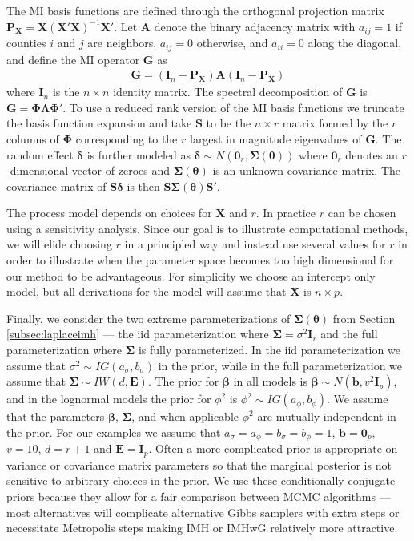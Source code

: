 \documentclass[12pt]{article}
\begin{document}
The MI basis functions are defined through the orthogonal projection matrix $\bm{P}_{\bm{X}} = \bm{X}(\bm{X}'\bm{X})^{-1}\bm{X}'$. Let $\bm{A}$ denote the binary adjacency matrix with $a_{ij} = 1$ if counties $i$ and $j$ are neighbors, $a_{ij}=0$ otherwise, and $a_{ii}=0$ along the diagonal, and define the MI operator $\bm{G}$ as
\begin{align*}
\bm{G} = (\bm{I}_n - \bm{P}_{\bm{X}})\bm{A}(\bm{I}_n - \bm{P}_{\bm{X}})
\end{align*}
where $\bm{I}_n$ is the $n\times n$ identity matrix. The spectral decomposition of $\bm{G}$ is $\bm{G} = \bm{\Phi}\bm{\Lambda}\bm{\Phi}'.$ To use a reduced rank version of the MI basis functions we truncate the basis function expansion and take $\bm{S}$ to be the $n\times r$ matrix formed by the $r$ columns of $\bm{\Phi}$ corresponding to the $r$ largest in magnitude eigenvalues of $\bm{G}$. The random effect $\bm{\delta}$ is further modeled as $\bm{\delta} \sim N(\bm{0}_r,\bm{\Sigma}(\bm{\theta}))$ where $\bm{0}_r$ denotes an $r$-dimensional vector of zeroes and $\bm{\Sigma}(\bm{\theta})$ is an unknown covariance matrix. The covariance matrix of $\bm{S}\bm{\delta}$ is then $\bm{S}\bm{\Sigma}(\bm{\theta})\bm{S}'$.

The process model depends on choices for $\bm{X}$ and $r$. In practice $r$ can be chosen using a sensitivity analysis. Since our goal is to illustrate computational methods, we will elide choosing $r$ in a principled way and instead use several values for $r$ in order to illustrate when the parameter space becomes too high dimensional for our method to be advantageous. For simplicity we choose an intercept only model, but all derivations for the model will assume that $\bm{X}$ is $n\times p$.

Finally, we consider the two extreme parameterizations of $\bm{\Sigma}(\bm{\theta})$ from Section \ref{subsec:laplaceimh} --- the iid parameterization where $\bm{\Sigma}=\sigma^2\bm{I}_r$ and the full parameterization where $\bm{\Sigma}$ is fully parameterized. In the iid parameterization we assume that $\sigma^2 \sim IG(a_\sigma, b_\sigma)$ in the prior, while in the full parameterization we assume that $\bm{\Sigma}\sim IW(d, \bm{E})$. The prior for $\bm{\beta}$ in all models is $\bm{\beta} \sim N(\bm{b}, v^2\bm{I}_p)$, and in the lognormal models the prior for $\phi^2$ is $\phi^2 \sim IG(a_\phi, b_\phi)$. We assume that the parameters $\bm{\beta}$, $\bm{\Sigma}$, and when applicable $\phi^2$ are mutually independent in the prior. For our examples we assume that $a_\sigma = a_\phi = b_\sigma = b_\phi = 1$, $\bm{b} = \bm{0}_p$, $v = 10$, $d = r + 1$ and $\bm{E} = \bm{I}_p$. Often a more complicated prior is appropriate on variance or covariance matrix parameters so that the marginal posterior is not sensitive to arbitrary choices in the prior. We use these conditionally conjugate priors because they allow for a fair comparison between MCMC algorithms --- most alternatives will complicate alternative Gibbs samplers with extra steps or necessitate Metropolis steps making IMH or IMHwG relatively more attractive.
\end{document}
